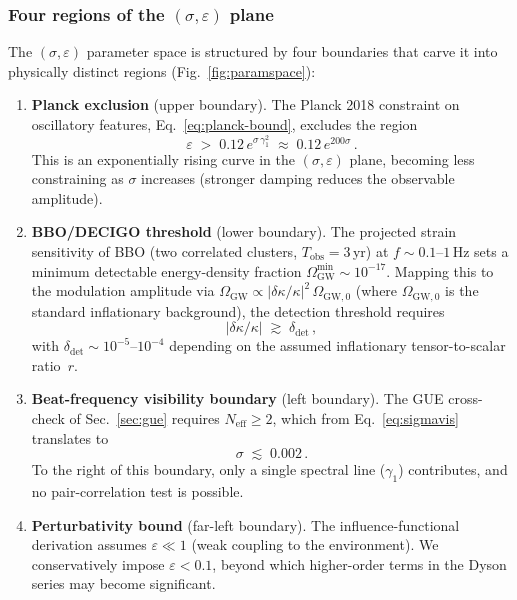 \documentclass[12pt,a4paper]{article}
\begin{document}
\subsubsection{Four regions of the $(\sigma,\varepsilon)$ plane}

The $(\sigma,\varepsilon)$ parameter space is
structured by four boundaries that carve it into
physically distinct regions (Fig.~\ref{fig:paramspace}):

\begin{enumerate}
\item \textbf{Planck exclusion} (upper boundary).
  The Planck 2018 constraint on oscillatory features,
  Eq.~\eqref{eq:planck-bound}, excludes the region
  \begin{equation}
    \varepsilon \;>\;
    0.12\,e^{\sigma\,\gamma_1^2}
    \;\approx\;
    0.12\,e^{200\sigma}\,.
  \end{equation}
  This is an exponentially rising curve in the
  $(\sigma,\varepsilon)$ plane, becoming less
  constraining as $\sigma$ increases (stronger damping
  reduces the observable amplitude).

\item \textbf{BBO/DECIGO threshold} (lower boundary).
  The projected strain sensitivity of BBO (two correlated
  clusters, $T_{\mathrm{obs}}=3\,$yr) at
  $f\sim 0.1$--$1\,$Hz sets a minimum detectable
  energy-density fraction
  $\Omega_{\mathrm{GW}}^{\min}\sim 10^{-17}$.
  Mapping this to the modulation amplitude via
  $\Omega_{\mathrm{GW}}\propto
  |\delta\kappa/\kappa|^2\,\Omega_{\mathrm{GW},0}$
  (where $\Omega_{\mathrm{GW},0}$ is the standard
  inflationary background), the detection threshold
  requires
  \begin{equation}\label{eq:bbo-threshold}
    |\delta\kappa/\kappa|
    \;\gtrsim\;
    \delta_{\mathrm{det}}\,,
  \end{equation}
  with $\delta_{\mathrm{det}}\sim 10^{-5}$--$10^{-4}$
  depending on the assumed inflationary tensor-to-scalar
  ratio~$r$.

\item \textbf{Beat-frequency visibility boundary}
  (left boundary).
  The GUE cross-check of Sec.~\ref{sec:gue}
  requires $N_{\mathrm{eff}}\ge 2$, which from
  Eq.~\eqref{eq:sigmavis} translates to
  \begin{equation}\label{eq:sigma-vis}
    \sigma \;\lesssim\; 0.002\,.
  \end{equation}
  To the right of this boundary, only a single
  spectral line ($\gamma_1$) contributes, and no
  pair-correlation test is possible.

\item \textbf{Perturbativity bound} (far-left boundary).
  The influence-functional derivation assumes
  $\varepsilon\ll 1$ (weak coupling to the environment).
  We conservatively impose $\varepsilon < 0.1$,
  beyond which higher-order terms in the
  Dyson series may become significant.
\end{enumerate}
\end{document}

